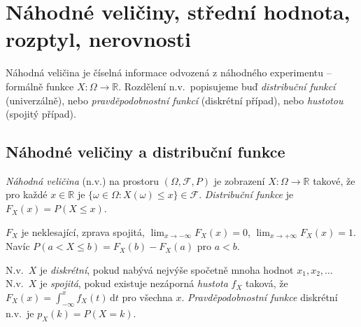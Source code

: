 \documentclass[11pt,a4paper]{article}
\newcommand{\R}{\mathbb{R}}
\begin{document}

\section{Náhodné veličiny, střední hodnota, rozptyl, nerovnosti}

Náhodná veličina je číselná informace odvozená z náhodného experimentu -- formálně funkce $X\colon\Omega\to\R$. Rozdělení n.v.\ popisujeme buď \emph{distribuční funkcí} (univerzálně), nebo \emph{pravděpodobnostní funkcí} (diskrétní případ), nebo \emph{hustotou} (spojitý případ).

\subsection{Náhodné veličiny a distribuční funkce}

\begin{definice}
\emph{Náhodná veličina} (n.v.) na prostoru $(\Omega,\mathcal{F},P)$ je zobrazení $X\colon\Omega\to\R$ takové, že pro každé $x\in\R$ je $\{\omega\in\Omega:X(\omega)\le x\}\in\mathcal{F}$. \emph{Distribuční funkce} je $F_X(x)=P(X\le x)$.
\end{definice}

\begin{veta}
$F_X$ je neklesající, zprava spojitá, $\lim_{x\to-\infty}F_X(x)=0$, $\lim_{x\to+\infty}F_X(x)=1$. Navíc $P(a<X\le b)=F_X(b)-F_X(a)$ pro $a<b$.
\end{veta}

\begin{definice}
N.v.\ $X$ je \emph{diskrétní}, pokud nabývá nejvýše spočetně mnoha hodnot $x_1,x_2,\dots$ N.v.\ $X$ je \emph{spojitá}, pokud existuje nezáporná \emph{hustota} $f_X$ taková, že $F_X(x)=\int_{-\infty}^{x} f_X(t)\,\mathrm{d}t$ pro všechna $x$. \emph{Pravděpodobnostní funkce} diskrétní n.v.\ je $p_X(k)=P(X=k)$.
\end{definice}

\end{document}
